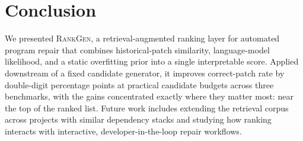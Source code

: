 \section{Conclusion}
We presented \textsc{RankGen}, a retrieval-augmented ranking layer for automated program repair that combines historical-patch similarity, language-model likelihood, and a static overfitting prior into a single interpretable score. Applied downstream of a fixed candidate generator, it improves correct-patch rate by double-digit percentage points at practical candidate budgets across three benchmarks, with the gains concentrated exactly where they matter most: near the top of the ranked list. Future work includes extending the retrieval corpus across projects with similar dependency stacks and studying how ranking interacts with interactive, developer-in-the-loop repair workflows.
